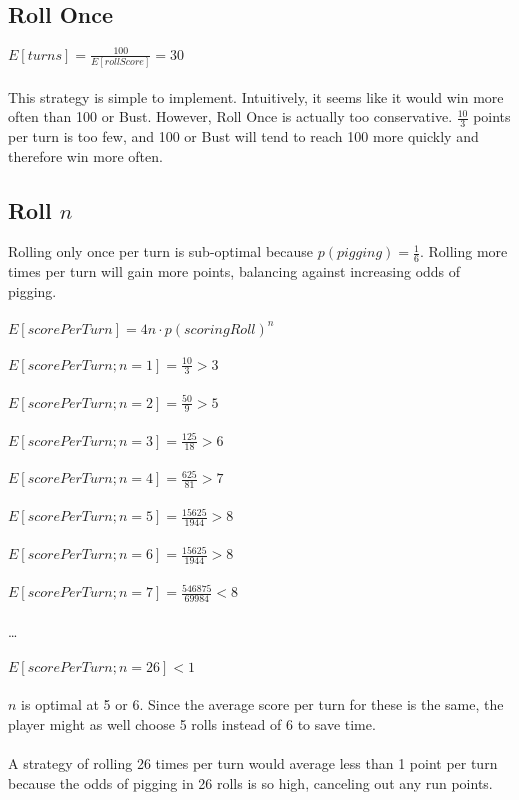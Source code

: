 \documentclass{article}
\begin{document}
\subsection*{Roll Once}
$E[turns] = \frac{100}{E[rollScore]} = 30$
\\\\
This strategy is simple to implement. Intuitively, it seems like it would win more often than 100 or Bust. However, Roll Once is actually too conservative. $\frac{10}{3}$ points per turn is too few, and 100 or Bust will tend to reach 100 more quickly and therefore win more often.
\subsection*{Roll $n$}
Rolling only once per turn is sub-optimal because $p(pigging) = \frac{1}{6}$. Rolling more times per turn will gain more points, balancing against increasing odds of pigging.
\\\\
$E[scorePerTurn] = 4n \cdot p(scoringRoll)^n$
\\\\
$E[scorePerTurn; n = 1] = \frac{10}{3} > 3$
\\\\
$E[scorePerTurn; n = 2] = \frac{50}{9} > 5$
\\\\
$E[scorePerTurn; n = 3] = \frac{125}{18} > 6$
\\\\
$E[scorePerTurn; n = 4] = \frac{625}{81} > 7$
\\\\
$E[scorePerTurn; n = 5] = \frac{15625}{1944} > 8$
\\\\
$E[scorePerTurn; n = 6] = \frac{15625}{1944} > 8$
\\\\
$E[scorePerTurn; n = 7] = \frac{546875}{69984} < 8$
\\\\
\ldots
\\\\
$E[scorePerTurn; n = 26] < 1$
\\\\
$n$ is optimal at 5 or 6. Since the average score per turn for these is the same, the player might as well choose 5 rolls instead of 6 to save time.
\\\\
A strategy of rolling 26 times per turn would average less than 1 point per turn because the odds of pigging in 26 rolls is so high, canceling out any run points.
\\\\
\end{document}
